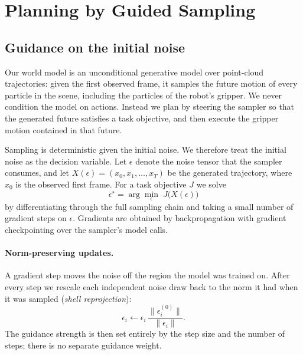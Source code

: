 
\section{Planning by Guided Sampling}
\label{sec:guidance}

\subsection{Guidance on the initial noise}
\label{sec:guidance-method}

Our world model is an unconditional generative model over point-cloud trajectories: given the first observed frame,
it samples the future motion of every particle in the scene, including the particles of the robot's gripper.
We never condition the model on actions. Instead we plan by steering the sampler so that the generated future
satisfies a task objective, and then execute the gripper motion contained in that future.

Sampling is deterministic given the initial noise. We therefore treat the initial noise as the decision variable.
Let $\epsilon$ denote the noise tensor that the sampler consumes, and let $X(\epsilon) = (x_0, x_1, \dots, x_T)$ be the
generated trajectory, where $x_0$ is the observed first frame. For a task objective $J$ we solve
\begin{equation}
  \epsilon^\star = \arg\min_{\epsilon} \; J\big(X(\epsilon)\big)
\end{equation}
by differentiating through the full sampling chain and taking a small number of gradient steps on $\epsilon$.
Gradients are obtained by backpropagation with gradient checkpointing over the sampler's model calls.

\paragraph{Norm-preserving updates.}
A gradient step moves the noise off the region the model was trained on. After every step we rescale each
independent noise draw back to the norm it had when it was sampled (\emph{shell reprojection}):
\begin{equation}
  \epsilon_i \leftarrow \epsilon_i \, \frac{\lVert \epsilon_i^{(0)} \rVert}{\lVert \epsilon_i \rVert}.
\end{equation}
The guidance strength is then set entirely by the step size and the number of steps; there is no separate guidance weight.

